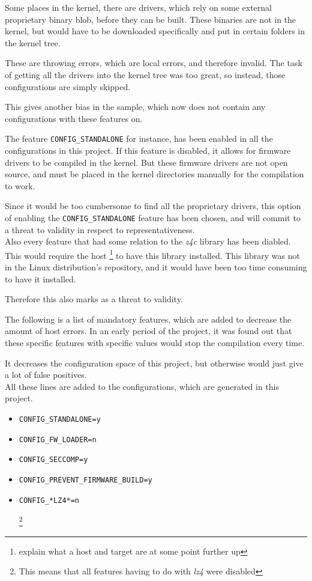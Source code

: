 \documentclass[a4paper,11pt]{report}
\newcommand{\textcode}[1]{
    \fboxsep=1pt
    \texttt{\colorbox{gray!20}{#1}}
}
\begin{document}
Some places in the kernel, there are drivers, which rely on some external 
proprietary binary blob, before they can be built. These binaries are not in 
the kernel, but would have to be downloaded specifically and put in certain 
folders in the kernel tree.

These are throwing errors, which are local errors, and therefore invalid. The 
task of getting all the drivers into the kernel tree was too great, so instead, 
those configurations are simply skipped.

This gives another bias in the sample, which now does not contain any 
configurations with these features on.


The feature \textcode{CONFIG\_STANDALONE} for instance, has been enabled in all 
the configurations in this project. If this feature is disabled, it allows for 
firmware drivers to be compiled in the kernel. But these firmware drivers are 
not open source, and must be placed in the kernel directories manually for the 
compilation to work.

Since it would be too cumbersome to find all the proprietary drivers, this 
option of enabling the \textcode{CONFIG\_STANDALONE} feature has been chosen, 
and will commit to a threat to validity in respect to representativeness.
\\

Also every feature that had some relation to the \emph{z4c} library has been 
diabled. This would require the host \footnote{explain what a host and target 
are at some point further up} to have this library installed. This library was 
not in the Linux distribution's repository, and it would have been too time 
consuming to have it installed. 

Therefore this also marks as a threat to validity.

The following is a list of mandatory features, which are added to decrease the 
amount of host errors. In an early period of the project, it was found out that 
these specific features with specific values would stop the compilation every 
time.

It decreases the configuration space of this project, but otherwise 
would just give a lot of false positives.
\\

All these lines are added to the configurations, which are generated in
this project.

\begin{itemize}
    \item \textcode{CONFIG\_STANDALONE=y}
    \item \textcode{CONFIG\_FW\_LOADER=n}
    \item \textcode{CONFIG\_SECCOMP=y}
    \item \textcode{CONFIG\_PREVENT\_FIRMWARE\_BUILD=y}
    \item \textcode{CONFIG\_*LZ4*=n}
        \footnote{This means that all features having to do with \emph{lz4} 
                    were disabled}
\end{itemize}
\end{document}
